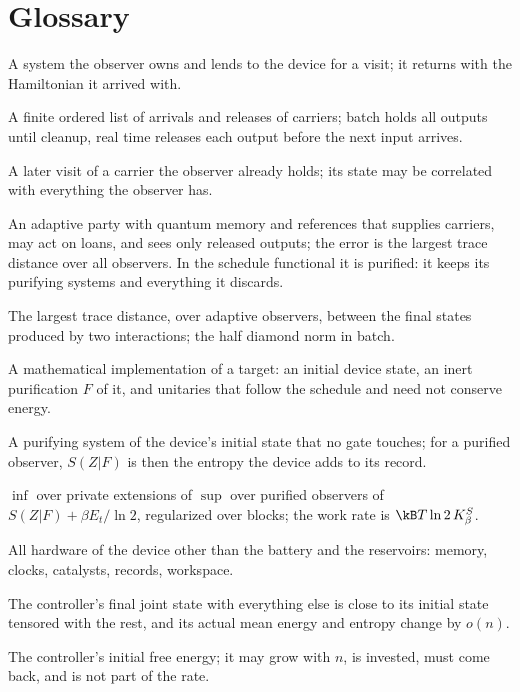 \section{Glossary}\label{app:glossary}

\begin{description}[leftmargin=!,labelwidth=3.6cm,style=nextline,itemsep=2pt]
\item[Carrier] A system the observer owns and lends to the device for a visit; it returns with the Hamiltonian it arrived with.
\item[Schedule] A finite ordered list of arrivals and releases of carriers; batch holds all outputs until cleanup, real time releases each output before the next input arrives.
\item[Loan] A later visit of a carrier the observer already holds; its state may be correlated with everything the observer has.
\item[Observer (tester)] An adaptive party with quantum memory and references that supplies carriers, may act on loans, and sees only released outputs; the error is the largest trace distance over all observers. In the schedule functional it is purified: it keeps its purifying systems and everything it discards.
\item[Strategy distance] The largest trace distance, over adaptive observers, between the final states produced by two interactions; the half diamond norm in batch.
\item[Private extension] A mathematical implementation of a target: an initial device state, an inert purification $F$ of it, and unitaries that follow the schedule and need not conserve energy.
\item[Inert purification $F$] A purifying system of the device's initial state that no gate touches; for a purified observer, $S(Z|F)$ is then the entropy the device adds to its record.
\item[Schedule functional $K_\beta^S$] $\inf$ over private extensions of $\sup$ over purified observers of $S(Z|F)+\beta E_t/\ln2$, regularized over blocks; the work rate is $\kB T\ln2\,K_\beta^S$.
\item[Controller] All hardware of the device other than the battery and the reservoirs: memory, clocks, catalysts, records, workspace.
\item[Returns approximately] The controller's final joint state with everything else is close to its initial state tensored with the rest, and its actual mean energy and entropy change by $o(n)$.
\item[Startup capital] The controller's initial free energy; it may grow with $n$, is invested, must come back, and is not part of the rate.

\end{description}
